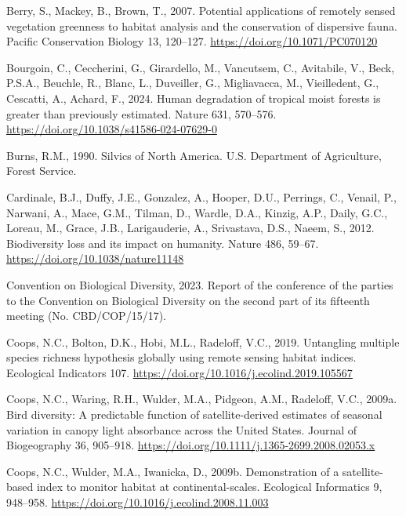 \documentclass[
]{agujournal2019}
\newlength{\cslhangindent}
\newenvironment{CSLReferences}[2] %
 {\begin{list}{}{%
  \setlength{\itemindent}{0pt}
  \setlength{\leftmargin}{0pt}
  \setlength{\parsep}{0pt}
  \ifodd #1
   \setlength{\leftmargin}{\cslhangindent}
   \setlength{\itemindent}{-1\cslhangindent}
  \fi
  \setlength{\itemsep}{#2\baselineskip}}}
 {\end{list}}
\begin{document}
\begin{CSLReferences}{1}{0}
Berry, S., Mackey, B., Brown, T., 2007. Potential applications of
remotely sensed vegetation greenness to habitat analysis and the
conservation of dispersive fauna. Pacific Conservation Biology 13,
120--127. \url{https://doi.org/10.1071/PC070120}

Bourgoin, C., Ceccherini, G., Girardello, M., Vancutsem, C., Avitabile,
V., Beck, P.S.A., Beuchle, R., Blanc, L., Duveiller, G., Migliavacca,
M., Vieilledent, G., Cescatti, A., Achard, F., 2024. Human degradation
of tropical moist forests is greater than previously estimated. Nature
631, 570--576. \url{https://doi.org/10.1038/s41586-024-07629-0}

Burns, R.M., 1990. Silvics of North America. U.S. Department of
Agriculture, Forest Service.

Cardinale, B.J., Duffy, J.E., Gonzalez, A., Hooper, D.U., Perrings, C.,
Venail, P., Narwani, A., Mace, G.M., Tilman, D., Wardle, D.A., Kinzig,
A.P., Daily, G.C., Loreau, M., Grace, J.B., Larigauderie, A.,
Srivastava, D.S., Naeem, S., 2012. Biodiversity loss and its impact on
humanity. Nature 486, 59--67. \url{https://doi.org/10.1038/nature11148}

Convention on Biological Diversity, 2023. Report of the conference of
the parties to the {Convention} on {Biological Diversity} on the second
part of its fifteenth meeting (No. CBD/COP/15/17).

Coops, N.C., Bolton, D.K., Hobi, M.L., Radeloff, V.C., 2019. Untangling
multiple species richness hypothesis globally using remote sensing
habitat indices. Ecological Indicators 107.
\url{https://doi.org/10.1016/j.ecolind.2019.105567}

Coops, N.C., Waring, R.H., Wulder, M.A., Pidgeon, A.M., Radeloff, V.C.,
2009a. Bird diversity: A predictable function of satellite-derived
estimates of seasonal variation in canopy light absorbance across the
{United States}. Journal of Biogeography 36, 905--918.
\url{https://doi.org/10.1111/j.1365-2699.2008.02053.x}

Coops, N.C., Wulder, M.A., Iwanicka, D., 2009b. Demonstration of a
satellite-based index to monitor habitat at continental-scales.
Ecological Informatics 9, 948--958.
\url{https://doi.org/10.1016/j.ecolind.2008.11.003}


\end{CSLReferences}
\end{document}
